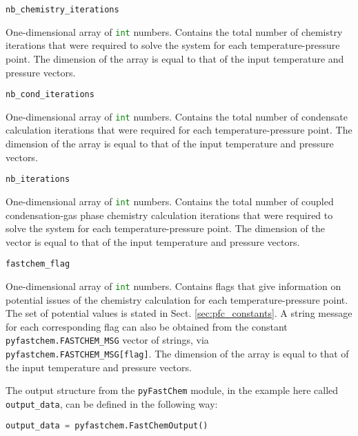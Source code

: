 \documentclass[numbers=noenddot]{aux/fcmanual}
\newcommand{\pfc}{\texttt{pyFastChem}\xspace}
\begin{document}
\bigbreak

\lstinline!nb_chemistry_iterations!
\begin{addmargin}[25pt]{0pt}
	One-dimensional array of \lstinline[language=Python]!int! numbers. Contains the total number of chemistry iterations that were required to solve the system for each temperature-pressure point. The dimension of the array is equal to that of the input temperature and pressure vectors.
\end{addmargin}

\bigbreak

\lstinline!nb_cond_iterations!
\begin{addmargin}[25pt]{0pt}
	One-dimensional array of \lstinline[language=Python]!int! numbers. Contains the total number of condensate calculation iterations that were required for each temperature-pressure point. The dimension of the array is equal to that of the input temperature and pressure vectors.
\end{addmargin}

\bigbreak

\lstinline!nb_iterations!
\begin{addmargin}[25pt]{0pt}
	One-dimensional array of \lstinline[language=Python]!int! numbers. Contains the total number of coupled condensation-gas phase chemistry calculation iterations that were required to solve the system for each temperature-pressure point. The dimension of the vector is equal to that of the input temperature and pressure vectors.
\end{addmargin}

\bigbreak

\lstinline!fastchem_flag!
\begin{addmargin}[25pt]{0pt}
	One-dimensional array of \lstinline[language=Python]!int! numbers. Contains flags that give information on potential issues of the chemistry calculation for each temperature-pressure point. The set of potential values is stated in Sect. \ref{sec:pfc_constants}. A string message for each corresponding flag can also be obtained from the constant \lstinline!pyfastchem.FASTCHEM_MSG! vector of strings, via \lstinline!pyfastchem.FASTCHEM_MSG[flag]!. The dimension of the array is equal to that of the input temperature and pressure vectors.
\end{addmargin}

\bigbreak

The output structure from the \pfc module, in the example here called \lstinline!output_data!, can be defined in the following way:
\begin{lstlisting}[language=Python]
	output_data = pyfastchem.FastChemOutput()
\end{lstlisting}
\end{document}
